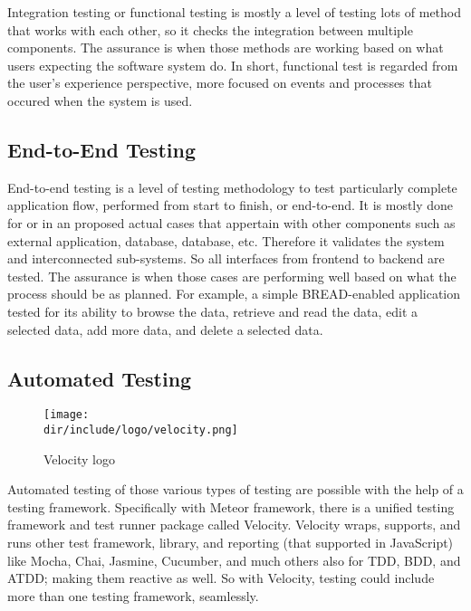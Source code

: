 Integration testing or functional testing is mostly a level of testing lots of method that works with each other, so it checks the integration between multiple components.
The assurance is when those methods are working based on what users expecting the software system do.
In short, functional test is regarded from the user's experience perspective, more focused on events and processes that occured when the system is used.

\subsection{End-to-End Testing}

End-to-end testing is a level of testing methodology to test particularly complete application flow, performed from start to finish, or end-to-end.
It is mostly done for or in an proposed actual cases that appertain with other components such as external application, database, database, etc.
Therefore it validates the system and interconnected sub-systems.
So all interfaces from frontend to backend are tested.
The assurance is when those cases are performing well based on what the process should be as planned.
For example, a simple \ac{BREAD}-enabled application tested for its ability to browse the data, retrieve and read the data, edit a selected data, add more data, and delete a selected data.

\subsection{Automated Testing}

\begin{wrapfigure}{r}{0.5\textwidth}
  \vspace{-20pt}
  \begin{center}
    \texttt{[image: \\dir/include/logo/velocity.png]}
  \end{center}
  \vspace{-20pt}
  \caption{Velocity logo}
  \label{fig:velocity-logo}
  \vspace{-10pt}
\end{wrapfigure}

Automated testing of those various types of testing are possible with the help of a testing framework.
Specifically with Meteor framework, there is a unified testing framework and test runner package called Velocity.
Velocity wraps, supports, and runs other test framework, library, and reporting (that supported in JavaScript) like Mocha, Chai, Jasmine, Cucumber, and much others also for \ac{TDD}, \ac{BDD}, and \ac{ATDD}; making them reactive as well.
So with Velocity, testing could include more than one testing framework, seamlessly.

